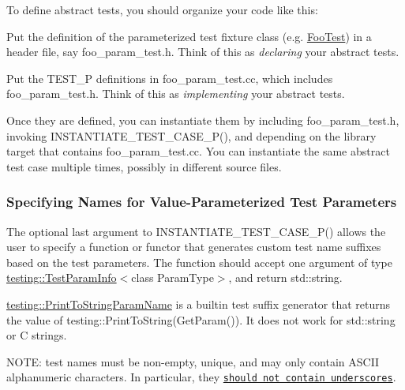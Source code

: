 To define abstract tests, you should organize your code like this\+:


\begin{DoxyEnumerate}
\item Put the definition of the parameterized test fixture class (e.\+g. {\ttfamily \mbox{\hyperlink{class_foo_test}{Foo\+Test}}}) in a header file, say {\ttfamily foo\+\_\+param\+\_\+test.\+h}. Think of this as {\itshape declaring} your abstract tests.
\end{DoxyEnumerate}
\begin{DoxyEnumerate}
\item Put the {\ttfamily T\+E\+S\+T\+\_\+P} definitions in {\ttfamily foo\+\_\+param\+\_\+test.\+cc}, which includes {\ttfamily foo\+\_\+param\+\_\+test.\+h}. Think of this as {\itshape implementing} your abstract tests.
\end{DoxyEnumerate}

Once they are defined, you can instantiate them by including {\ttfamily foo\+\_\+param\+\_\+test.\+h}, invoking {\ttfamily I\+N\+S\+T\+A\+N\+T\+I\+A\+T\+E\+\_\+\+T\+E\+S\+T\+\_\+\+C\+A\+S\+E\+\_\+\+P()}, and depending on the library target that contains {\ttfamily foo\+\_\+param\+\_\+test.\+cc}. You can instantiate the same abstract test case multiple times, possibly in different source files.

\subsubsection*{Specifying Names for Value-\/\+Parameterized Test Parameters}

The optional last argument to {\ttfamily I\+N\+S\+T\+A\+N\+T\+I\+A\+T\+E\+\_\+\+T\+E\+S\+T\+\_\+\+C\+A\+S\+E\+\_\+\+P()} allows the user to specify a function or functor that generates custom test name suffixes based on the test parameters. The function should accept one argument of type {\ttfamily \mbox{\hyperlink{structtesting_1_1_test_param_info}{testing\+::\+Test\+Param\+Info}}$<$class Param\+Type$>$}, and return {\ttfamily std\+::string}.

{\ttfamily \mbox{\hyperlink{structtesting_1_1_print_to_string_param_name}{testing\+::\+Print\+To\+String\+Param\+Name}}} is a builtin test suffix generator that returns the value of {\ttfamily testing\+::\+Print\+To\+String(\+Get\+Param())}. It does not work for {\ttfamily std\+::string} or C strings.

N\+O\+TE\+: test names must be non-\/empty, unique, and may only contain A\+S\+C\+II alphanumeric characters. In particular, they \href{https://github.com/google/googletest/blob/master/googletest/docs/faq.md#why-should-test-case-names-and-test-names-not-contain-underscore}{\tt should not contain underscores}.


